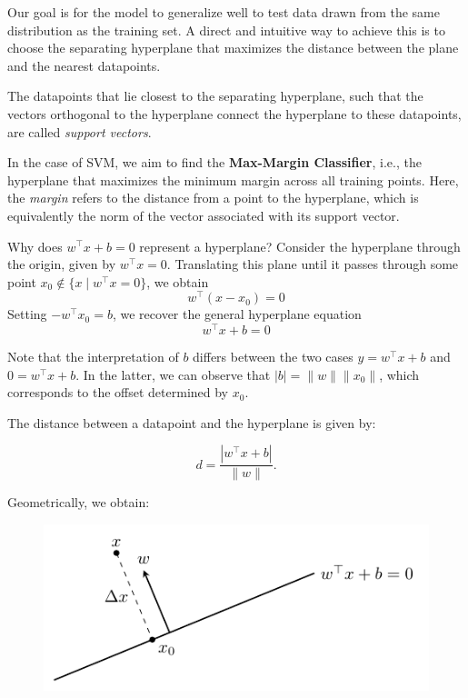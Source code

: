 \documentclass[../main]{subfiles}
\begin{document}
Our goal is for the model to generalize well to test data drawn from the same distribution as the training set.  
A direct and intuitive way to achieve this is to choose the separating hyperplane that maximizes the distance between the plane and the nearest datapoints.

\begin{definition}
    The datapoints that lie closest to the separating hyperplane, such that the vectors orthogonal to the hyperplane connect the hyperplane to these datapoints, are called \emph{support vectors}.
\end{definition}
In the case of SVM, we aim to find the \textbf{Max-Margin Classifier}, i.e., the hyperplane that maximizes the minimum margin across all training points.  
Here, the \emph{margin} refers to the distance from a point to the hyperplane, which is equivalently the norm of the vector associated with its support vector.

\begin{remark}
    Why does $w^\top x + b = 0$ represent a hyperplane?  
    Consider the hyperplane through the origin, given by $w^\top x = 0$.  
    Translating this plane until it passes through some point $x_0 \notin \{x \mid w^\top x = 0\}$, we obtain
    \[
        w^\top (x - x_0) = 0
    \]
    Setting $-w^\top x_0 = b$, we recover the general hyperplane equation
    \[
        w^\top x + b = 0
    \]
\end{remark}

\begin{remark}
    Note that the interpretation of $b$ differs between the two cases $y = w^\top x + b$ and $0 = w^\top x + b$.  
    In the latter, we can observe that $|b| = \|w\| \|x_0\|$, which corresponds to the offset determined by $x_0$.
\end{remark}
The distance between a datapoint and the hyperplane is given by:
\begin{theorem}
    \begin{equation}
        d = \frac{|w^\top x + b|}{\|w\|}. \label{3.15}
    \end{equation}
\end{theorem}

Geometrically, we obtain:

\begin{figure}[H]
    \centering
    \includegraphics{../../tikz/3/1.pdf}
    \label{2-lr}
\end{figure}
\end{document}
